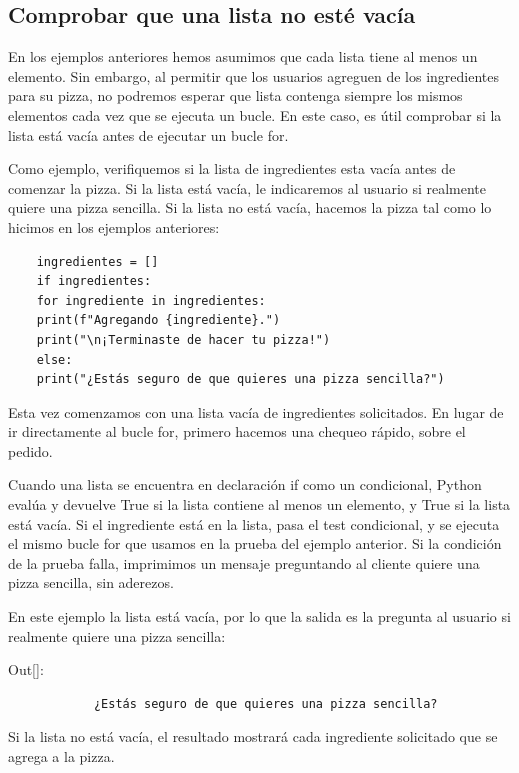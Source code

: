 \subsection{Comprobar que una lista no esté vacía}  

En los ejemplos anteriores hemos asumimos que cada lista tiene al menos un elemento. Sin embargo, al permitir que los usuarios
agreguen de los ingredientes para su pizza, no podremos esperar que lista contenga siempre los mismos elementos 
cada vez que se ejecuta un bucle. En este caso, es útil comprobar si la lista está vacía antes de ejecutar un bucle {\ttfamily for}.

Como ejemplo, verifiquemos si la lista de ingredientes  esta  vacía antes de comenzar la pizza. Si la lista está vacía, le indicaremos al usuario  si realmente quiere una pizza sencilla. Si la lista no está vacía, 
hacemos la pizza tal como lo hicimos en los ejemplos anteriores:

\hspace{-2.5cm}{\ttfamily \scriptsize sencilla.py} \vspace{-0.5cm}
\begin{lstlisting}	
	ingredientes = []
	if ingredientes:
	for ingrediente in ingredientes:
	print(f"Agregando {ingrediente}.")
	print("\n¡Terminaste de hacer tu pizza!")
	else:
	print("¿Estás seguro de que quieres una pizza sencilla?")
\end{lstlisting}

Esta vez comenzamos con una lista vacía de ingredientes solicitados. En lugar de ir directamente al bucle {\ttfamily for}, primero hacemos una chequeo rápido, sobre el pedido. 

Cuando una lista se encuentra en declaración {\ttfamily if} como un condicional, Python  evalúa y devuelve {\ttfamily True} si la lista contiene al menos  un elemento, y {\ttfamily True} si la lista está vacía.  Si el ingrediente está en la lista, pasa el test condicional, y se  ejecuta el mismo bucle {\ttfamily for} que usamos en la prueba del ejemplo anterior.  Si la condición de la prueba falla, imprimimos un mensaje preguntando al cliente quiere una pizza sencilla, sin aderezos.

En este ejemplo la lista está vacía, por lo que la salida es la pregunta al usuario si realmente quiere
una pizza sencilla:\vspace{0.09cm}


{\ttfamily\scriptsize\noindent Out[]:\vspace{-0.292cm}	
	{\color{blue} 		
		\begin{verbatim}
			¿Estás seguro de que quieres una pizza sencilla?			
		\end{verbatim}
}}
Si la lista no está vacía, el resultado mostrará cada ingrediente solicitado que se agrega a la pizza. 

